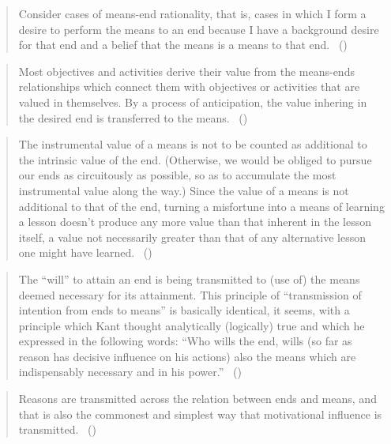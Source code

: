 \documentclass[10pt]{article}
\begin{document}
\begin{quote}
  Consider cases of means-end rationality, that is, cases in which I form a desire to perform the means to an end because I have a background desire for that end and a belief that the means is a means to that end.\linebreak
  \mbox{ }\hfill(\cite[84]{Smith:2004aa})
\end{quote}

\begin{quote}
  Most objectives and activities derive their value from the means-ends relationships which connect them with objectives or activities that are valued in themselves.
  By a process of anticipation, the value inhering in the desired end is transferred to the means.\nolinebreak
  \mbox{ }\hfill(\cite[61]{Simon:1997aa})
\end{quote}

\begin{quote}
  The instrumental value of a means is not to be counted as additional to the intrinsic value of the end.
  (Otherwise, we would be obliged to pursue our ends as circuitously as possible, so as to accumulate the most instrumental value along the way.)
  Since the value of a means is not additional to that of the end, turning a misfortune into a means of learning a lesson doesn’t produce any more value than that inherent in the lesson itself, a value not necessarily greater than that of any alternative lesson one might have learned.\linebreak
  \mbox{ }\hfill(\cite[65]{Velleman:2000ab})
\end{quote}

\begin{quote}
  The ``will'' to attain an end is being transmitted to (use of) the means deemed necessary for its attainment.
  This principle of ``transmission of intention from ends to means'' is basically identical, it seems, with a principle which Kant thought analytically (logically) true and which he expressed in the following words:
  ``Who wills the end, wills (so far as reason has decisive influence on his actions) also the means which are indispensably necessary and in his power.''\nolinebreak
  \mbox{ }\hfill(\cite[40]{Von-Wright:1972aa})
\end{quote}

\begin{quote}
  Reasons are transmitted across the relation between ends and means, and that is also the commonest and simplest way that motivational influence is transmitted.\nolinebreak
  \mbox{ }\hfill(\cite[33]{Nagel:1970aa})
\end{quote}
\end{document}
